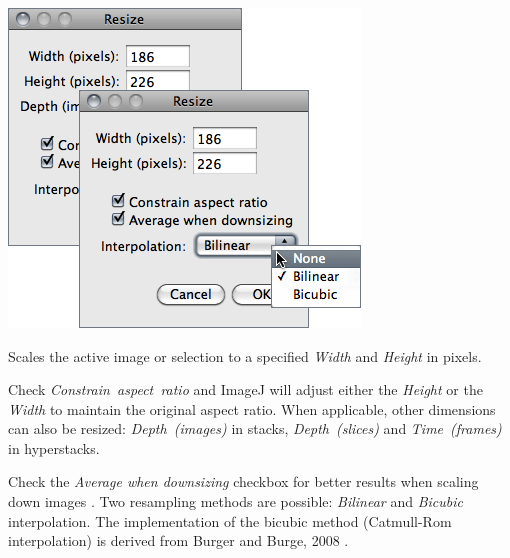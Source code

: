 

\subsubsection[\protect\userinterface{Size\ldots{}}]{\protect{}\label{sub:Size...}}

\begin{minipage}[c][1\totalheight][t]{0.487\columnwidth}%
\includegraphics[scale=0.55]{images/Resize}%
\end{minipage}%
\begin{minipage}[c][1\totalheight][t]{0.513\columnwidth}%
Scales the active image or selection to a specified \emph{Width} and
\emph{Height} in pixels.

\medskip{}
Check \emph{Constrain~aspect~ratio} and ImageJ will adjust either
the \emph{Height} or the \emph{Width} to maintain the original aspect
ratio. When applicable, other dimensions can also be resized: \emph{Depth~(images)}
in stacks, \emph{Depth}~\emph{(slices) }and \emph{Time}~\emph{(frames)}
in hyperstacks.

\medskip{}


Check the \emph{Average when downsizing} checkbox for better results
when scaling down images \cite{C-Resizer-Scaler}.
Two resampling
methods are possible: \emph{Bilinear}
and \emph{Bicubic}
interpolation. The implementation of the bicubic
method (Catmull-Rom
interpolation) is derived from Burger and Burge, 2008 \cite{Burger:2008p14082}.%
\end{minipage}


